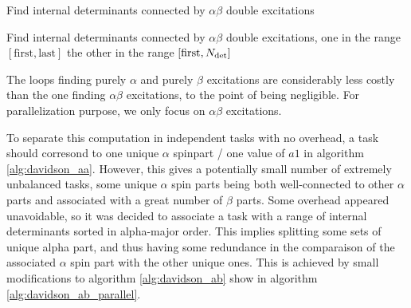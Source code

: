 \documentclass[./thesis.tex]{subfiles}
\begin{document}
\begin{algorithm}
\caption{Find internal determinants connected by $\alpha \beta$ double excitations}
\label{alg:davidson_ab}

\end{algorithm}

\begin{algorithm}
\label{alg:davidson_ab_parallel}
\caption{Find internal determinants connected by $\alpha \beta$ double excitations, one in the range $[\text{first}, \text{last}]$ the other in the range $[\text{first}, {N_\text{det}}]$}

\end{algorithm}

The loops finding purely $\alpha$ and purely $\beta$ excitations are considerably less costly than the one finding $\alpha \beta$ excitations, to the point of being negligible. For parallelization purpose, we only focus on $\alpha \beta$ excitations.

To separate this computation in independent tasks with no overhead, a task should corresond to one unique $\alpha$ spinpart / one value of $a1$ in algorithm \ref{alg:davidson_aa}. However, this gives a potentially small number of extremely unbalanced tasks, some unique $\alpha$ spin parts being both well-connected to other $\alpha$ parts and associated with a great number of $\beta$ parts.
Some overhead appeared unavoidable, so it was decided to associate a task with a range of internal determinants sorted in alpha-major order. This implies splitting some sets of unique alpha part, and thus having some redundance in the comparaison of the associated $\alpha$ spin part with the other unique ones.
This is achieved by small modifications to algorithm \ref{alg:davidson_ab} show in algorithm \ref{alg:davidson_ab_parallel}.
\end{document}
